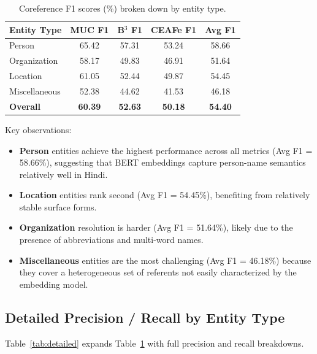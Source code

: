\documentclass[12pt,a4paper]{article}
\begin{document}
\begin{table}[H]
    \centering
    \caption{Coreference F1 scores (\%) broken down by entity type.}
    \label{tab:entity}
    \renewcommand{\arraystretch}{1.35}
    \begin{tabular}{lcccc}
        \toprule
        \textbf{Entity Type} & \textbf{MUC F1} & \textbf{B$^{3}$ F1}
                             & \textbf{CEAFe F1} & \textbf{Avg F1} \\
        \midrule
        Person        & 65.42 & 57.31 & 53.24 & 58.66 \\
        Organization  & 58.17 & 49.83 & 46.91 & 51.64 \\
        Location      & 61.05 & 52.44 & 49.87 & 54.45 \\
        Miscellaneous & 52.38 & 44.62 & 41.53 & 46.18 \\
        \midrule
        \textbf{Overall} & \textbf{60.39} & \textbf{52.63}
                         & \textbf{50.18} & \textbf{54.40} \\
        \bottomrule
    \end{tabular}
\end{table}

Key observations:
\begin{itemize}
    \item \textbf{Person} entities achieve the highest performance across
          all metrics (Avg F1 = 58.66\%), suggesting that BERT embeddings
          capture person-name semantics relatively well in Hindi.
    \item \textbf{Location} entities rank second (Avg F1 = 54.45\%),
          benefiting from relatively stable surface forms.
    \item \textbf{Organization} resolution is harder (Avg F1 = 51.64\%),
          likely due to the presence of abbreviations and multi-word names.
    \item \textbf{Miscellaneous} entities are the most challenging
          (Avg F1 = 46.18\%) because they cover a heterogeneous set of
          referents not easily characterized by the embedding model.
\end{itemize}

\subsection{Detailed Precision / Recall by Entity Type}

Table~\ref{tab:detailed} expands Table~\ref{tab:entity} with full
precision and recall breakdowns.
\end{document}
